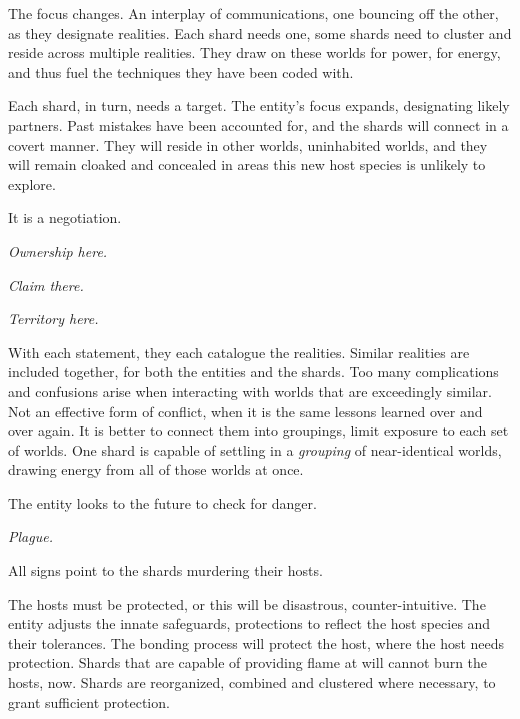 The focus changes.  An interplay of communications, one bouncing off the other, as they designate realities.  Each shard needs one, some shards need to cluster and reside across multiple realities.  They draw on these worlds for power, for energy, and thus fuel the techniques they have been coded with.



Each shard, in turn, needs a target.  The entity's focus expands, designating likely partners.  Past mistakes have been accounted for, and the shards will connect in a covert manner.  They will reside in other worlds, uninhabited worlds, and they will remain cloaked and concealed in areas this new host species is unlikely to explore.



It is a negotiation.



\emph{Ownership here.}



\emph{Claim there.}



\emph{Territory here.}



With each statement, they each catalogue the realities.  Similar realities are included together, for both the entities and the shards.  Too many complications and confusions arise when interacting with worlds that are exceedingly similar.  Not an effective form of conflict, when it is the same lessons learned over and over again.  It is better to connect them into groupings, limit exposure to each set of worlds.  One shard is capable of settling in a \emph{grouping} of near-identical worlds, drawing energy from all of those worlds at once.



The entity looks to the future to check for danger.



\emph{Plague.}



All signs point to the shards murdering their hosts.



The hosts must be protected, or this will be disastrous, counter-intuitive.  The entity adjusts the innate safeguards, protections to reflect the host species and their tolerances.  The bonding process will protect the host, where the host needs protection.  Shards that are capable of providing flame at will cannot burn the hosts, now.  Shards are reorganized, combined and clustered where necessary, to grant sufficient protection.



